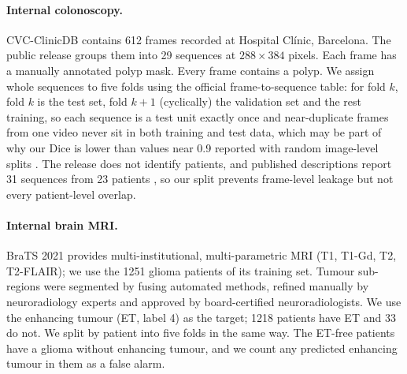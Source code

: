 \paragraph{Internal colonoscopy.} CVC-ClinicDB \cite{bernal2015cvc} contains 612 frames recorded at Hospital Cl\'inic, Barcelona. The public release groups them into 29 sequences at $288\times384$ pixels. Each frame has a manually annotated polyp mask. %
Every frame contains a polyp. We assign whole sequences to five folds using the official frame-to-sequence table: for fold $k$, fold $k$ is the test set, fold $k+1$ (cyclically) the validation set and the rest training, so each sequence is a test unit exactly once and near-duplicate frames from one video never sit in both training and test data, which may be part of why our Dice is lower than values near 0.9 reported with random image-level splits \cite{fan2020pranet}. The release does not identify patients, and published descriptions report 31 sequences from 23 patients \cite{vazquez2017endoscene}, so our split prevents frame-level leakage but not every patient-level overlap.

\paragraph{Internal brain MRI.} BraTS 2021 \cite{baid2021brats} provides multi-institutional, multi-parametric MRI (T1, T1-Gd, T2, T2-FLAIR); we use the 1251 glioma patients of its training set. Tumour sub-regions were segmented by fusing automated methods, refined manually by neuroradiology experts and approved by board-certified neuroradiologists.
We use the enhancing tumour (ET, label 4) as the target; 1218 patients have ET and 33 do not. We split by patient into five folds in the same way. The ET-free patients have a glioma without enhancing tumour, and we count any predicted enhancing tumour in them as a false alarm.

